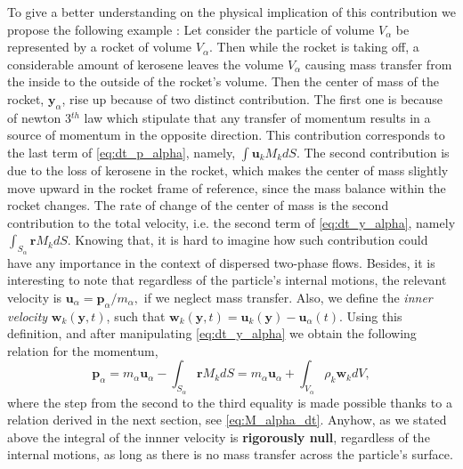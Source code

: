 To give a better understanding on the physical implication of this contribution we propose the following example :
Let consider the particle of volume $V_\alpha$ be represented by a rocket of volume $V_\alpha$.
Then while the rocket is taking off, a considerable amount of kerosene leaves the volume $V_\alpha$ causing mass transfer from the inside to the outside of the rocket's volume.
Then the center of mass of the rocket, $\textbf{y}_\alpha$, rise up because of two distinct contribution.
The first one is because of newton 3$^{th}$ law which stipulate that any transfer of momentum results in a source of momentum in the opposite direction.
This contribution corresponds to the last term of \ref{eq:dt_p_alpha}, namely, $\int \textbf{u}_kM_k dS$.
The second contribution is due to the loss of kerosene in the rocket, which makes the center of mass slightly move upward in the rocket frame of reference, since the mass balance within the rocket changes.
The rate of change of the center of mass is the second contribution to the total velocity, i.e. the second term of \ref{eq:dt_y_alpha}, namely $\int_{S_\alpha} \textbf{r}M_kdS$.  
Knowing that, it is hard to imagine how such contribution could have any importance in the context of dispersed two-phase flows. 
Besides, it is interesting to note that regardless of the particle's internal motions, the relevant velocity is $\textbf{u}_\alpha = \textbf{p}_\alpha /m_\alpha,$ if we neglect mass transfer.
Also, we define the \textit{inner velocity} $\textbf{w}_k(\textbf{y},t)$, such that $\textbf{w}_k(\textbf{y},t) = \textbf{u}_k(\textbf{y}) - \textbf{u}_\alpha(t)$. 
Using this definition, and after manipulating \ref{eq:dt_y_alpha} we obtain the following relation for the momentum, 
\begin{equation}
    \textbf{p}_\alpha
    =  m_\alpha \textbf{u}_\alpha
    - \int_{S_\alpha} \textbf{r} M_k dS
    = m_\alpha \textbf{u}_\alpha
    + \int_{V_\alpha} \rho_k \textbf{w}_k dV,
    \label{eq:velocity_definition}
\end{equation}
where the step from the second to the third equality is made possible thanks to a relation derived in the next section, see \ref{eq:M_alpha_dt}. 
Anyhow, as we stated above the integral of the innner velocity is \textbf{rigorously null}, regardless of the internal motions, as long as there is no mass transfer across the  particle's surface.  

